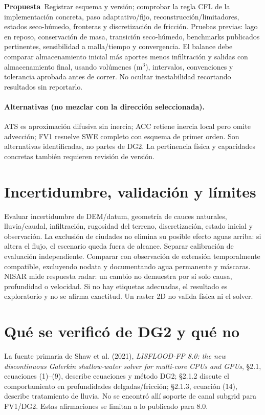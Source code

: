 \documentclass[11pt,a4paper]{article}
\newcommand{\prop}{\textbf{Propuesta}}
\begin{document}
\prop\ Registrar esquema y versión; comprobar la regla CFL de la implementación concreta, paso adaptativo/fijo, reconstrucción/limitadores, estados seco-húmedo, fronteras y discretización de fricción. Pruebas previas: lago en reposo, conservación de masa, transición seco-húmedo, benchmarks publicados pertinentes, sensibilidad a malla/tiempo y convergencia. El balance debe comparar almacenamiento inicial más aportes menos infiltración y salidas con almacenamiento final, usando volúmenes (m$^3$), intervalos, convenciones y tolerancia aprobada antes de correr. No ocultar inestabilidad recortando resultados sin reportarlo.

\paragraph{Alternativas (no mezclar con la dirección seleccionada).} ATS es aproximación difusiva sin inercia; ACC retiene inercia local pero omite advección; FV1 resuelve SWE completo con esquema de primer orden. Son alternativas identificadas, no partes de DG2. La pertinencia física y capacidades concretas también requieren revisión de versión.

\section{Incertidumbre, validación y límites}
Evaluar incertidumbre de DEM/datum, geometría de cauces naturales, lluvia/caudal, infiltración, rugosidad del terreno, discretización, estado inicial y observación. La exclusión de ciudades no elimina su posible efecto aguas arriba: si altera el flujo, el escenario queda fuera de alcance. Separar calibración de evaluación independiente. Comparar con observación de extensión temporalmente compatible, excluyendo nodata y documentando agua permanente y máscaras. NISAR mide respuesta radar: un cambio no demuestra por sí solo causa, profundidad o velocidad. Si no hay etiquetas adecuadas, el resultado es exploratorio y no se afirma exactitud. Un raster 2D no valida física ni el solver.

\section{Qué se verificó de DG2 y qué no}
La fuente primaria de Shaw et al. (2021), \emph{LISFLOOD-FP 8.0: the new discontinuous Galerkin shallow-water solver for multi-core CPUs and GPUs}, §2.1, ecuaciones (1)--(9), describe ecuaciones y método DG2; §2.1.2 discute el comportamiento en profundidades delgadas/fricción; §2.1.3, ecuación (14), describe tratamiento de lluvia. No se encontró allí soporte de canal subgrid para FV1/DG2. Estas afirmaciones se limitan a lo publicado para 8.0.
\end{document}
